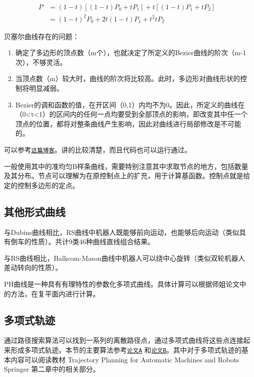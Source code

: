 \begin{align*}
    P &= (1-t)\left[(1-t)P_0 + tP_1\right] + t\left[ (1-t)P_1 + tP_2\right] \\
      &= (1-t)^2 P_0 + 2t(1-t)P_1 + t^2 tP_2
\end{align*}

贝塞尔曲线存在的问题：
\begin{enumerate}
	\item 确定了多边形的顶点数（m个），也就决定了所定义的Bezier曲线的阶次（m-1次），不够灵活。
    \item 当顶点数（m）较大时，曲线的阶次将比较高。此时，多边形对曲线形状的控制将明显减弱。    
    \item Bezier的调和函数的值，在开区间（0,1）内均不为0。因此，所定义的曲线在（0<t<1）的区间内的任何一点均要受到全部顶点的影响，即改变其中任一个顶点的位置，都将对整条曲线产生影响，因此对曲线进行局部修改是不可能的。
\end{enumerate}


可以参考\href{https://blog.csdn.net/Mr_Grit/article/details/45603627}{\texttt{这篇博客}}。讲的比较清楚，而且代码也可以运行通过。

一般使用其中的准均匀B样条曲线，需要特别注意其中求取节点的地方，包括数量及其分布。节点可以理解为在原控制点上的扩充，用于计算基函数。控制点就是给定的控制多边形的定点。




\subsection{其他形式曲线}

与Dubins曲线相比，RS曲线中机器人既能够前向运动，也能够后向运动（类似具有倒车的性质）。共计9类46种曲线直线组合结果。


与RS曲线相比，Balkcom-Mason曲线中机器人可以绕中心旋转（类似双轮机器人差动转向的性质）。


PH曲线是一种具有有理特性的参数化多项式曲线。具体计算可以根据师姐论文中的方法，在复平面内进行计算。

\subsection{多项式轨迹}
通过路径搜索算法可以找到一系列的离散路径点，通过多项式曲线将这些点连接起来形成多项式轨迹。本节的主要算法参考\href{https://pdfs.semanticscholar.org/2376/078d13761387cabb933798b93a706c2ea7ef.pdf}{\texttt{论文A}}
和\href{http://www-personal.acfr.usyd.edu.au/spns/cdm/papers/Mellinger.pdf}{\texttt{论文B}}。其中对于多项式轨迹的基本内容可以阅读教材 Trajectory Planning for Automatic Machines and Robots Springer 第二章中的相关部分。

